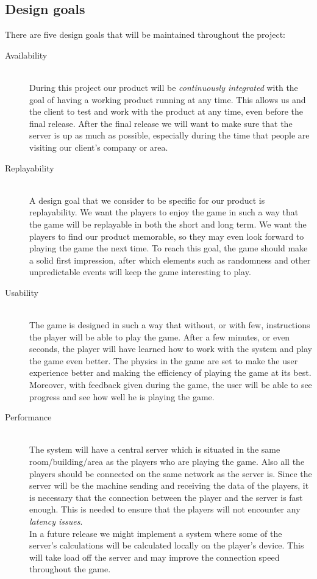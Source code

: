 \documentclass[11pt,twoside,a4paper]{article}
\begin{document}
\subsection{Design goals}
There are five design goals that will be maintained throughout the project:
\begin{description}
\item[Availability] \hfill \\
    During this project our product will be \emph{continuously integrated} with the goal of having a working product running at any time. This allows us and the client to test and work with the product at any time, even before the final release.
After the final release we will want to make sure that the server is up as much as possible, especially during the time that people are visiting our client's company or area. 
\item[Replayability] \hfill \\
    A design goal that we consider to be specific for our product is replayability. We want the players to enjoy the game in such a way that the game will be replayable in both the short and long term. We want the players to find our product memorable, so they may even look forward to playing the game the next time. To reach this goal, the game should make a solid first impression, after which elements such as randomness and other unpredictable events will keep the game interesting to play.
\item[Usability] \hfill \\
    The game is designed in such a way that without, or with few, instructions the player will be able to play the game. After a few minutes, or even seconds, the player will have learned how to work with the system and play the game even better. The physics in the game are set to make the user experience better and making the efficiency of playing the game at its best.\\ Moreover, with feedback given during the game, the user will be able to see progress and see how well he is playing the game.
    
\item[Performance] \hfill \\
    The system will have a central server which is situated in the same room/building/area as the players who are playing the game. Also all the players should be connected on the same network as the server is. Since the server will be the machine sending and receiving the data of the players, it is necessary that the connection between the player and the server is fast enough. This is needed to ensure that the players will not encounter any \emph{latency issues}. \\
    In a future release we might implement a system where some of the server's calculations will be calculated locally on the player's device. This will take load off the server and may improve the connection speed throughout the game.
    
\end{description}
\end{document}
